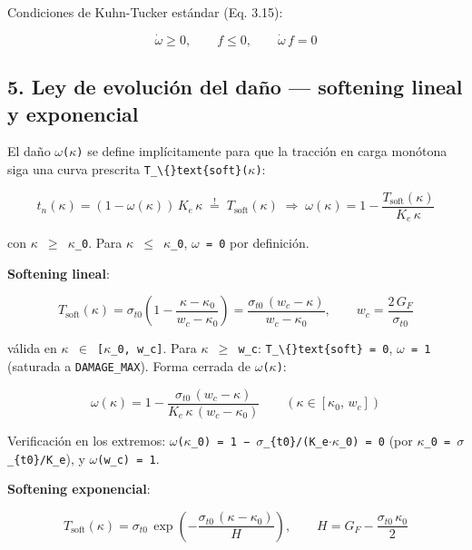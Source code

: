 \documentclass[11pt,letterpaper,oneside]{report}
\begin{document}
Condiciones de Kuhn-Tucker estándar (Eq. 3.15):

\[
\dot\omega \geq 0, \qquad f \leq 0, \qquad \dot\omega\,f = 0
\]

\subsection{5. Ley de evolución del daño --- softening lineal y exponencial}

El daño \texttt{\ensuremath{\omega}(\ensuremath{\kappa})} se define implícitamente para que la tracción en carga monótona siga una curva prescrita \texttt{T\_\textbackslash\{\}text\{soft\}(\ensuremath{\kappa})}:

\[
t_n(\kappa) = (1 - \omega(\kappa))\,K_e\,\kappa \;\stackrel{!}{=}\; T_\text{soft}(\kappa) \;\Rightarrow\; \omega(\kappa) = 1 - \frac{T_\text{soft}(\kappa)}{K_e\,\kappa}
\]

con \texttt{\ensuremath{\kappa} \ensuremath{\ge} \ensuremath{\kappa}\_0}. Para \texttt{\ensuremath{\kappa} \ensuremath{\le} \ensuremath{\kappa}\_0}, \texttt{\ensuremath{\omega} = 0} por definición.

\textbf{Softening lineal}:

\[
T_\text{soft}(\kappa) = \sigma_{t0}\left(1 - \frac{\kappa - \kappa_0}{w_c - \kappa_0}\right) = \frac{\sigma_{t0}\,(w_c - \kappa)}{w_c - \kappa_0}, \qquad w_c = \frac{2\,G_F}{\sigma_{t0}}
\]

válida en \texttt{\ensuremath{\kappa} \ensuremath{\in} [\ensuremath{\kappa}\_0, w\_c]}. Para \texttt{\ensuremath{\kappa} \ensuremath{\ge} w\_c}: \texttt{T\_\textbackslash\{\}text\{soft\} = 0}, \texttt{\ensuremath{\omega} = 1} (saturada a \texttt{DAMAGE\_MAX}). Forma cerrada de \texttt{\ensuremath{\omega}(\ensuremath{\kappa})}:

\[
\omega(\kappa) = 1 - \frac{\sigma_{t0}\,(w_c - \kappa)}{K_e\,\kappa\,(w_c - \kappa_0)} \qquad (\kappa \in [\kappa_0,\,w_c])
\]

Verificación en los extremos: \texttt{\ensuremath{\omega}(\ensuremath{\kappa}\_0) = 1 − \ensuremath{\sigma}\_\{t0\}/(K\_e\ensuremath{\cdot}\ensuremath{\kappa}\_0) = 0} (por \texttt{\ensuremath{\kappa}\_0 = \ensuremath{\sigma}\_\{t0\}/K\_e}), y \texttt{\ensuremath{\omega}(w\_c) = 1}.

\textbf{Softening exponencial}:

\[
T_\text{soft}(\kappa) = \sigma_{t0}\,\exp\left(-\frac{\sigma_{t0}\,(\kappa - \kappa_0)}{H}\right), \qquad H = G_F - \frac{\sigma_{t0}\,\kappa_0}{2}
\]
\end{document}
